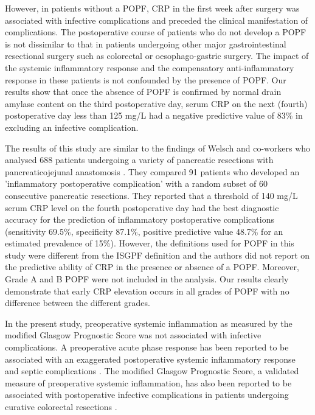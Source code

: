 However, in patients without a POPF, CRP in the first week after surgery was associated with infective complications and preceded the clinical manifestation of complications. 
The postoperative course of patients who do not develop a POPF is not dissimilar to that in patients undergoing other major gastrointestinal resectional surgery such as colorectal or oesophago-gastric surgery. 
The impact of the systemic inflammatory response and the compensatory anti-inflammatory response in these patients is not confounded by the presence of POPF. 
Our results show that once the absence of POPF is confirmed by normal drain amylase content on the third postoperative day, serum CRP on the next (fourth) postoperative day less than 125 mg/L had a negative predictive value of 83\% in excluding an infective complication. 

The results of this study are similar to the findings of Welsch and co-workers who analysed 688 patients undergoing a variety of pancreatic resections with pancreaticojejunal anastomosis \parencite{welsch_persisting_2008}. 
They compared 91 patients who developed an 'inflammatory postoperative complication' with a random subset of 60 consecutive pancreatic resections. 
They reported that a threshold of 140 mg/L serum CRP level on the fourth postoperative day had the best diagnostic accuracy for the prediction of inflammatory postoperative complications (sensitivity 69.5\%, specificity 87.1\%, positive predictive value 48.7\% for an estimated prevalence of 15\%). 
However, the definitions used for POPF in this study were different from the ISGPF definition and the authors did not report on the predictive ability of CRP in the presence or absence of a POPF. 
Moreover, Grade A and B POPF were not included in the analysis. 
Our results clearly demonstrate that early CRP elevation occurs in all grades of POPF with no difference between the different grades.

In the present study, preoperative systemic inflammation as measured by the modified Glasgow Prognostic Score was not associated with infective complications. 
A preoperative acute phase response has been reported to be associated with an exaggerated postoperative systemic inflammatory response and septic complications \parencite{haupt_association_1997}. 
The modified Glasgow Prognostic Score, a validated measure of preoperative systemic inflammation, has also been reported to be associated with postoperative infective complications in patients undergoing curative colorectal resections \parencite{moyes_preoperative_2009}. 

